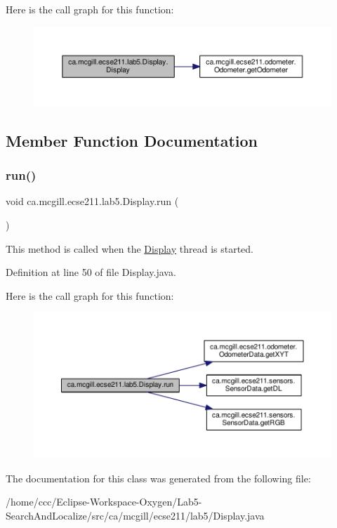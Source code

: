 Here is the call graph for this function\+:
\nopagebreak
\begin{figure}[H]
\begin{center}
\leavevmode
\includegraphics[width=350pt]{classca_1_1mcgill_1_1ecse211_1_1lab5_1_1_display_abb1c01962b84cfad6ff897ce490b365a_cgraph}
\end{center}
\end{figure}


\subsection{Member Function Documentation}
\mbox{\label{classca_1_1mcgill_1_1ecse211_1_1lab5_1_1_display_a047e885f7170ba80f60fd3b4b2bc79a9}} 
\subsubsection{\texorpdfstring{run()}{run()}}
{\footnotesize\ttfamily void ca.\+mcgill.\+ecse211.\+lab5.\+Display.\+run (\begin{DoxyParamCaption}{ }\end{DoxyParamCaption})}

This method is called when the \hyperlink{classca_1_1mcgill_1_1ecse211_1_1lab5_1_1_display}{Display} thread is started. 

Definition at line 50 of file Display.\+java.

Here is the call graph for this function\+:
\nopagebreak
\begin{figure}[H]
\begin{center}
\leavevmode
\includegraphics[width=350pt]{classca_1_1mcgill_1_1ecse211_1_1lab5_1_1_display_a047e885f7170ba80f60fd3b4b2bc79a9_cgraph}
\end{center}
\end{figure}


The documentation for this class was generated from the following file\+:\begin{DoxyCompactItemize}
\item 
/home/ccc/\+Eclipse-\/\+Workspace-\/\+Oxygen/\+Lab5-\/\+Search\+And\+Localize/src/ca/mcgill/ecse211/lab5/Display.\+java\end{DoxyCompactItemize}
